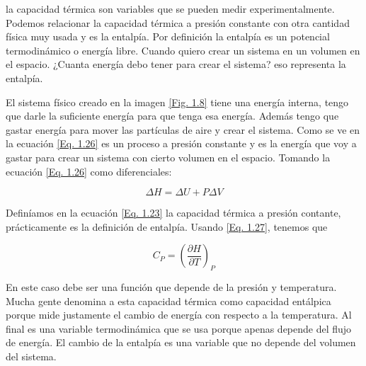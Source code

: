 \documentclass[11pt,fleqn]{book}
\begin{document}
la capacidad térmica son variables que se pueden medir experimentalmente. Podemos relacionar la capacidad térmica a presión constante con otra cantidad física muy usada y es la entalpía. Por definición la entalpía es un potencial termodinámico o energía libre. Cuando quiero crear un sistema en un volumen en el espacio. ¿Cuanta energía debo tener para crear el sistema? eso representa la entalpía.
\begin{comment}

\begin{figure}[H]
    \begin{minipage}[c]{0.4\linewidth}
        \centering
        \texttt{[image: Sdf]}
        \caption{Caption}
        \label{Fig. 1.8}
    \end{minipage}
\begin{minipage}[c]{0.4\linewidth}
    \begin{equation}
        H=U+PV
        \label{Eq. 1.26}
    \end{equation}
\end{minipage}
\end{figure}

\end{comment}

El sistema físico creado en la imagen \ref{Fig. 1.8} tiene una energía interna, tengo que darle la suficiente energía para que tenga esa energía. Además tengo que gastar energía para mover las partículas de aire y crear el sistema. Como se ve en la ecuación \ref{Eq. 1.26} es un proceso a presión constante y es la energía que voy a gastar para crear un sistema con cierto volumen en el espacio. Tomando la ecuación \ref{Eq. 1.26} como diferenciales:

\begin{equation}
    \Delta H=\Delta U+P\Delta V
    \label{Eq. 1.27}
\end{equation}

Definíamos en la ecuación \ref{Eq. 1.23} la capacidad térmica a presión contante, prácticamente es la definición de entalpía. Usando \ref{Eq. 1.27}, tenemos que

\begin{equation}
    C_{P}=\left(\frac{\partial H}{\partial T}\right)_{P}
    \label{Eq. 1.28}
\end{equation}

En este caso debe ser una función que depende de la presión y temperatura. Mucha gente denomina a esta capacidad térmica como capacidad entálpica porque mide justamente el cambio de energía con respecto a la temperatura. Al final es una variable termodinámica que se usa porque apenas depende del flujo de energía. El cambio de la entalpía es una variable que no depende del volumen del sistema.
\end{document}
